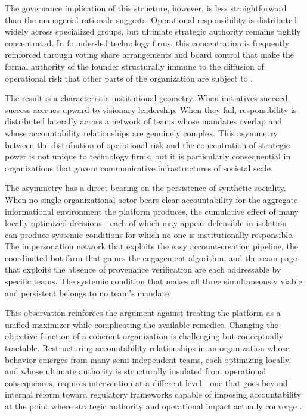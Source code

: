 \documentclass[12pt,a4paper]{article}
\begin{document}
The governance implication of this structure, however, is less straightforward than the
managerial rationale suggests. Operational responsibility is distributed widely across
specialized groups, but ultimate strategic authority remains tightly concentrated. In founder-led
technology firms, this concentration is frequently reinforced through voting share arrangements
and board control that make the formal authority of the founder structurally immune to the
diffusion of operational risk that other parts of the organization are subject to
\citep{zuboff2019}.

The result is a characteristic institutional geometry. When initiatives succeed, success accrues
upward to visionary leadership. When they fail, responsibility is distributed laterally across
a network of teams whose mandates overlap and whose accountability relationships are genuinely
complex. This asymmetry between the distribution of operational risk and the concentration of
strategic power is not unique to technology firms, but it is particularly consequential in
organizations that govern communicative infrastructures of societal scale.

The asymmetry has a direct bearing on the persistence of synthetic sociality. When no single
organizational actor bears clear accountability for the aggregate informational environment the
platform produces, the cumulative effect of many locally optimized decisions---each of which
may appear defensible in isolation---can produce systemic conditions for which no one is
institutionally responsible. The impersonation network that exploits the easy account-creation
pipeline, the coordinated bot farm that games the engagement algorithm, and the scam page that
exploits the absence of provenance verification are each addressable by specific teams. The
systemic condition that makes all three simultaneously viable and persistent belongs to no team's
mandate.

This observation reinforces the argument against treating the platform as a unified maximizer
while complicating the available remedies. Changing the objective function of a coherent
organization is challenging but conceptually tractable. Restructuring accountability relationships
in an organization whose behavior emerges from many semi-independent teams, each optimizing
locally, and whose ultimate authority is structurally insulated from operational consequences,
requires intervention at a different level---one that goes beyond internal reform toward
regulatory frameworks capable of imposing accountability at the point where strategic authority
and operational impact actually converge \citep{tufekci2015,noble2018}.
\end{document}
